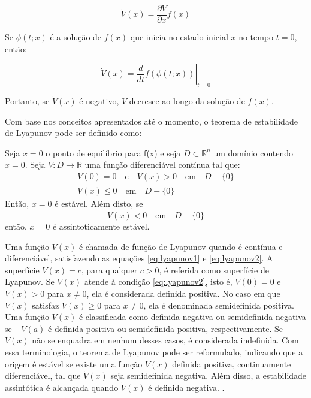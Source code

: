 $$ \dot{V}(x) = \frac{\partial V}{\partial x}f(x) $$

Se $\phi(t;x)$ é a solução de $f(x)$ que inicia no estado inicial $x$ no tempo $t = 0$, então:

$$ \dot{V}(x) = \left. \frac{d}{dt}f(\phi(t;x))\right|_{t=0} $$

Portanto, se $\dot{V}(x)$ é negativo, $V$ decresce ao longo da solução de $f(x)$.

Com base nos conceitos apresentados até o momento, o teorema de estabilidade de Lyapunov pode ser definido como:

\begin{theorem}
  Seja $x = 0$ o ponto de equilíbrio para f(x) e seja $D \subset \mathbb{R}^n$ um domínio contendo $x = 0$. Seja $V : D \rightarrow \mathbb{R}$ uma função diferenciável contínua tal que:
  \begin{gather}
    V(0) = 0 \quad \text{e} \quad V(x) > 0 \quad \mathrm{em} \quad D - \{0\} \label{eq:lyapunov1} \\
    \dot{V}(x) \leq 0 \quad \mathrm{em} \quad D - \{0\} \label{eq:lyapunov2}
  \end{gather}
  Então, $x=0$ é estável. Além disto, se
  \begin{equation}
    \dot{V}(x) < 0 \quad \mathrm{em} \quad D - \{0\} \label{eq:lyapunov3}
  \end{equation}
  então, $x=0$ é assintoticamente estável.
\end{theorem}

Uma função $V(x)$ é chamada de função de Lyapunov quando é contínua e diferenciável, satisfazendo as equações \eqref{eq:lyapunov1} e \eqref{eq:lyapunov2}. A superfície $V(x) = c$, para qualquer $c > 0$, é referida como superfície de Lyapunov. Se $V(x)$ atende à condição \eqref{eq:lyapunov2}, isto é, $V(0) = 0$ e $V(x) > 0$ para $x \neq 0$, ela é considerada definida positiva. No caso em que $V(x)$ satisfaz $V(x) \geq 0$ para $x \neq 0$, ela é denominada semidefinida positiva. Uma função $V(x)$ é classificada como definida negativa ou semidefinida negativa se $-V(a)$ é definida positiva ou semidefinida positiva, respectivamente. Se $V(x)$ não se enquadra em nenhum desses casos, é considerada indefinida. Com essa terminologia, o teorema de Lyapunov pode ser reformulado, indicando que a origem é estável se existe uma função $V(x)$ definida positiva, continuamente diferenciável, tal que $\dot{V}(x)$ seja semidefinida negativa. Além disso, a estabilidade assintótica é alcançada quando $\dot{V}(x)$ é definida negativa. \cite{khalil2002}.

